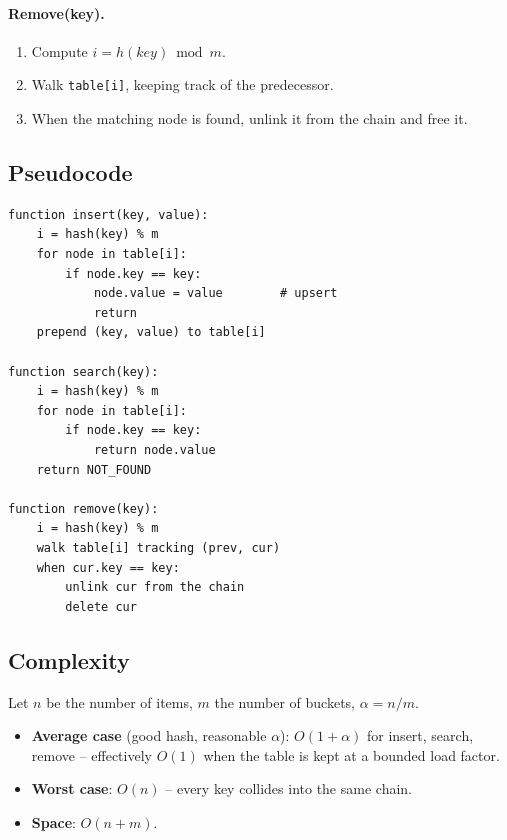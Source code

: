 \documentclass[11pt]{article}
\begin{document}
\paragraph{Remove(key).}
\begin{enumerate}[leftmargin=*]
    \item Compute $i = h(key) \bmod m$.
    \item Walk \texttt{table[i]}, keeping track of the predecessor.
    \item When the matching node is found, unlink it from the chain and
          free it.
\end{enumerate}

\subsection*{Pseudocode}
\begin{lstlisting}[basicstyle=\ttfamily\small,frame=single]
function insert(key, value):
    i = hash(key) % m
    for node in table[i]:
        if node.key == key:
            node.value = value        # upsert
            return
    prepend (key, value) to table[i]

function search(key):
    i = hash(key) % m
    for node in table[i]:
        if node.key == key:
            return node.value
    return NOT_FOUND

function remove(key):
    i = hash(key) % m
    walk table[i] tracking (prev, cur)
    when cur.key == key:
        unlink cur from the chain
        delete cur
\end{lstlisting}

\subsection*{Complexity}
Let $n$ be the number of items, $m$ the number of buckets,
$\alpha = n/m$.
\begin{itemize}[leftmargin=*]
    \item \textbf{Average case} (good hash, reasonable $\alpha$):
          $O(1 + \alpha)$ for insert, search, remove -- effectively
          $O(1)$ when the table is kept at a bounded load factor.
    \item \textbf{Worst case}: $O(n)$ -- every key collides into the
          same chain.
    \item \textbf{Space}: $O(n + m)$.
\end{itemize}
\end{document}
